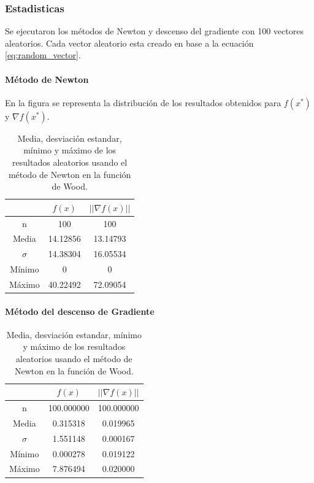 \subsubsection{Estadisticas}

Se ejecutaron los métodos de Newton y descenso del gradiente con 100 vectores aleatorios. Cada vector aleatorio esta creado en base a la ecuación \ref{eq:random_vector}.

\paragraph{Método de Newton}

En la figura se representa la distribución de los resultados obtenidos para $f(x^*)$ y $\nabla f(x^*)$.

\begin{table}[H]
    \centering
    \begin{tabular}{ccc} \hline
                 & $f(x)$   & $||\nabla f(x)||$ \\ \hline
        n        & 100      & 100               \\
        Media    & 14.12856 & 13.14793          \\
        $\sigma$ & 14.38304 & 16.05534          \\
        Mínimo   & 0        & 0                 \\
        Máximo   & 40.22492 & 72.09054          \\\hline
    \end{tabular}
    \caption{Media, desviación estandar, mínimo y máximo de los resultados aleatorios usando el método de Newton en la función de Wood.}
    \label{table:wood_100_random_newton}
\end{table}


\paragraph{Método del descenso de Gradiente}


\begin{table}[H]
    \centering
    \begin{tabular}{ccc} \hline
                 & $f(x)$     & $||\nabla f(x)||$ \\ \hline
        n        & 100.000000 & 100.000000        \\
        Media    & 0.315318   & 0.019965          \\
        $\sigma$ & 1.551148   & 0.000167          \\
        Mínimo   & 0.000278   & 0.019122          \\
        Máximo   & 7.876494   & 0.020000          \\ \hline
    \end{tabular}
    \caption{Media, desviación estandar, mínimo y máximo de los resultados aleatorios usando el método de Newton en la función de Wood.}
    \label{table:wood_100_random_gradient}
\end{table}
